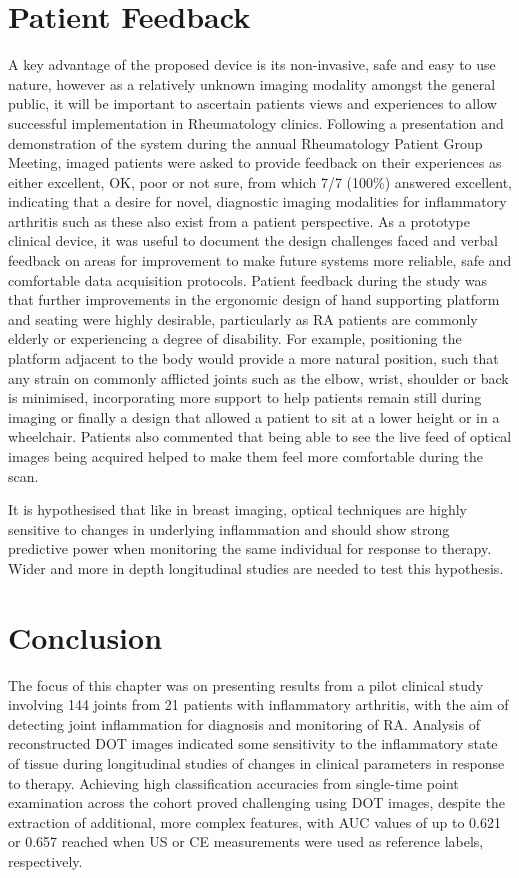 \documentclass[twoside]{bhamthesis}
\theoremstyle{definition}
\begin{document}
\section{Patient Feedback}

A key advantage of the proposed device is its non-invasive, safe and easy to use nature, however as a relatively unknown imaging modality amongst the general public, it will be important to ascertain patients views and experiences to allow successful implementation in Rheumatology clinics. Following a presentation and demonstration of the system during the annual Rheumatology Patient Group Meeting, imaged patients were asked to provide feedback on their experiences as either excellent, OK, poor or not sure, from which 7/7 (100\%) answered excellent, indicating that a desire for novel, diagnostic imaging modalities for inflammatory arthritis such as these also exist from a patient perspective. As a prototype clinical device, it was useful to document the design challenges faced and verbal feedback on areas for improvement to make future systems more reliable, safe and comfortable data acquisition protocols. Patient feedback during the study was that further improvements in the ergonomic design of hand supporting platform and seating were highly desirable, particularly as RA patients are commonly elderly or experiencing a degree of disability. For example, positioning the platform adjacent to the body would provide a more natural position, such that any strain on commonly afflicted joints such as the elbow, wrist, shoulder or back is minimised, incorporating more support to help patients remain still during imaging or finally a design that allowed a patient to sit at a lower height or in a wheelchair. Patients also commented that being able to see the live feed of optical images being acquired helped to make them feel more comfortable during the scan.

It is hypothesised that like in breast imaging, optical techniques are highly sensitive to changes in underlying inflammation and should show strong predictive power when monitoring the same individual for response to therapy. Wider and more in depth longitudinal studies are needed to test this hypothesis.

\section{Conclusion}

The focus of this chapter was on presenting results from a pilot clinical study involving 144 joints from 21 patients with inflammatory arthritis, with the aim of detecting joint inflammation for diagnosis and monitoring of RA. Analysis of reconstructed DOT images indicated some sensitivity to the inflammatory state of tissue during longitudinal studies of changes in clinical parameters in response to therapy. Achieving high classification accuracies from single-time point examination across the cohort proved challenging using DOT images, despite the extraction of additional, more complex features, with AUC values of up to 0.621 or 0.657 reached when US or CE measurements were used as reference labels, respectively. 
\end{document}
